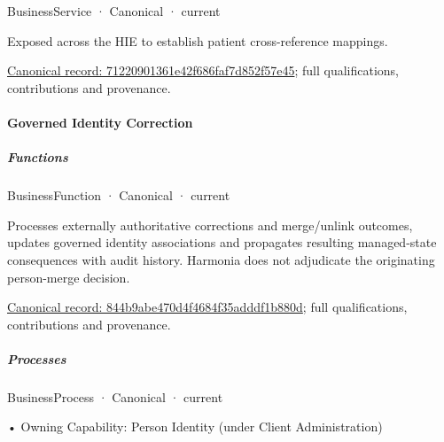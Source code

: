 

\label{element:71220901361e42f686faf7d852f57e45}
{\small BusinessService · Canonical · current}\par

Exposed across the HIE to establish patient cross-reference mappings.


{\footnotesize \href{../../../../continuum/business/business-service/71220901361e42f686faf7d852f57e45.md}{Canonical record: 71220901361e42f686faf7d852f57e45}; full qualifications, contributions and provenance.}\par
\paragraph{Governed Identity Correction}

\subparagraph{Functions}



\label{element:844b9abe470d4f4684f35adddf1b880d}
{\small BusinessFunction · Canonical · current}\par

Processes externally authoritative corrections and merge/unlink outcomes, updates governed identity associations and propagates resulting managed-state consequences with audit history. Harmonia does not adjudicate the originating person-merge decision.


{\footnotesize \href{../../../../continuum/business/business-function/844b9abe470d4f4684f35adddf1b880d.md}{Canonical record: 844b9abe470d4f4684f35adddf1b880d}; full qualifications, contributions and provenance.}\par
\subparagraph{Processes}



\label{element:72f3c63da45d44868579a3bb15d1568c}
{\small BusinessProcess · Canonical · current}\par

•
Owning Capability: Person Identity (under Client Administration)



